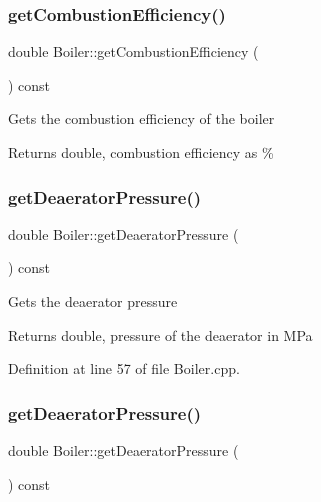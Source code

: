 \subsubsection{\texorpdfstring{get\+Combustion\+Efficiency()}{getCombustionEfficiency()}\hspace{0.1cm}{\footnotesize\ttfamily [3/3]}}
{\footnotesize\ttfamily double Boiler\+::get\+Combustion\+Efficiency (\begin{DoxyParamCaption}{ }\end{DoxyParamCaption}) const}

Gets the combustion efficiency of the boiler \begin{DoxyReturn}{Returns}
double, combustion efficiency as \% 
\end{DoxyReturn}
\mbox{\label{class_boiler_aad4786e7b68084e65a35dd6235517b8c}} 
\subsubsection{\texorpdfstring{get\+Deaerator\+Pressure()}{getDeaeratorPressure()}\hspace{0.1cm}{\footnotesize\ttfamily [1/3]}}
{\footnotesize\ttfamily double Boiler\+::get\+Deaerator\+Pressure (\begin{DoxyParamCaption}{ }\end{DoxyParamCaption}) const}

Gets the deaerator pressure \begin{DoxyReturn}{Returns}
double, pressure of the deaerator in M\+Pa 
\end{DoxyReturn}


Definition at line 57 of file Boiler.\+cpp.

\mbox{\label{class_boiler_aad4786e7b68084e65a35dd6235517b8c}} 
\subsubsection{\texorpdfstring{get\+Deaerator\+Pressure()}{getDeaeratorPressure()}\hspace{0.1cm}{\footnotesize\ttfamily [2/3]}}
{\footnotesize\ttfamily double Boiler\+::get\+Deaerator\+Pressure (\begin{DoxyParamCaption}{ }\end{DoxyParamCaption}) const}

